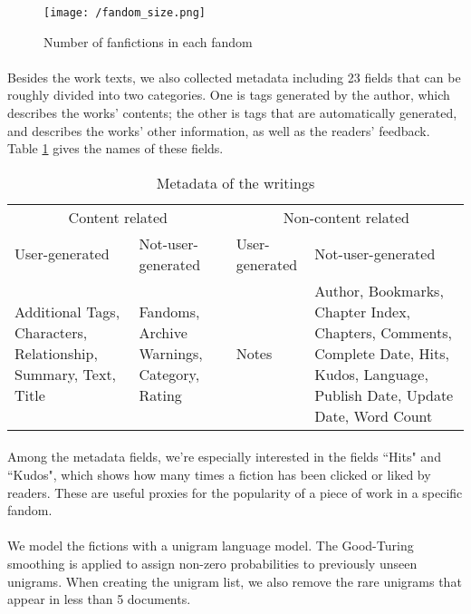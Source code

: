 \documentclass[11pt]{article} %
\begin{document}
\begin{figure}[htbp]
\begin{center}
\texttt{[image: /fandom\_size.png]}
\caption{Number of fanfictions in each fandom}
\label{fig:fandom_size}
\end{center}
\end{figure}


\paragraph{} Besides the work texts, we also collected metadata including 23 fields that can be roughly divided into two categories. One is tags generated by the author, which describes the works' contents; the other is tags that are automatically generated, and describes the works’ other information, as well as the readers' feedback. Table \ref{tab:metadata} gives the names of these fields. 

\begin{table}[htp]
\caption{Metadata of the writings}
\begin{center}
\begin{tabular}{p{3cm}|p{3cm}|p{3cm}|p{3cm}}
  \hline			
 \multicolumn{2}{c}{ Content related} & \multicolumn{2}{c}{Non-content related}\\ 
 User-generated & Not-user-generated &  User-generated & Not-user-generated \\
\hline
Additional Tags, Characters, Relationship, Summary, Text, Title
 & Fandoms,  Archive Warnings, Category, Rating
&  Notes
& Author, Bookmarks, Chapter Index, Chapters, Comments, Complete Date, Hits, Kudos, Language, Publish Date, Update Date, Word Count\\
\hline
\end{tabular}
\end{center}
\label{tab:metadata}
\end{table}%

\paragraph{} Among the metadata fields, we're especially interested in the fields ``Hits" and ``Kudos", which shows how many times a fiction has been clicked or liked by readers. These are useful proxies for the popularity of a piece of work in a specific fandom.

\paragraph{} We model the fictions with a unigram language model. The Good-Turing smoothing\cite{gales1995good} is applied to assign non-zero probabilities to previously unseen unigrams. When creating the unigram list, we also remove the rare unigrams that appear in less than 5 documents.
\end{document}
